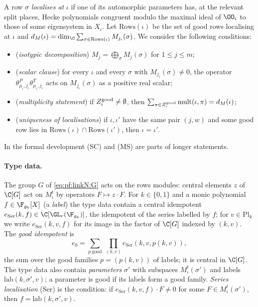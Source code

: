A row $\sigma$ \emph{localises at} $\iota$ if one of its automorphic parameters has, at the relevant split places, Hecke
polynomials congruent modulo the maximal ideal of $\OO_\iota$ to those of some eigensystem in $X_\iota$. Let $\mathrm{Rows}(\iota)$ be
the set of good rows localising at $\iota$ and $d_M(\iota)=\dim_\C\sum_{\sigma\in\mathrm{Rows}(\iota)}M_{j_\iota}(\sigma)$. We consider
the following conditions:
\begin{itemize}[leftmargin=3.2em]
\item[(ID)] (\emph{isotypic decomposition}) $M_j=\bigoplus_\sigma M_j(\sigma)$ for $1\le j\le m$;
\item[(SC)] (\emph{scalar clause}) for every $\iota$ and every $\sigma$ with $M_{j_\iota}(\sigma)\ne0$, the operator
$\theta^P_{\mu_\iota,j_\iota}\theta^T_{\mu_\iota,j_\iota}$ acts on $M_{j_\iota}(\sigma)$ as a positive real scalar;
\item[(MS)] (\emph{multiplicity statement}) if $Z^{\mathrm{good}}_\iota\ne\emptyset$, then
$\sum_{\pi\in Z^{\mathrm{good}}_\iota}\mathrm{mult}(\iota,\pi)=d_M(\iota)$;
\item[(LU)] (\emph{uniqueness of localisations}) if $\iota,\iota'$ have the same pair $(j,w)$ and some good row lies in
$\mathrm{Rows}(\iota)\cap\mathrm{Rows}(\iota')$, then $\iota=\iota'$.
\end{itemize}
In the formal development (SC) and (MS) are parts of longer statements.

\paragraph{Type data.}
The group $G$ of \eqref{eq:pf:linkN:G} acts on the rows modules: central elements $z$ of $\C[G]$ act on $M^t_\iota$ by operators
$F\mapsto z\cdot F$. For $k\in\{0,1\}$ and a monic polynomial $f\in\F_{g_k}[X]$ (a \emph{label}) the type data contain a central
idempotent $e_{\mathrm{Ser}}(k,f)\in\C[\GL_r(\F_{g_k})]$, the idempotent of the series labelled by $f$; for $v\in\mathrm{Pl}_k$ we
write $e_{\mathrm{Ser}}(k,v,f)$ for its image in the factor of $\C[G]$ indexed by $(k,v)$. The \emph{good idempotent} is
\[
e_0=\sum_{p\ \mathrm{good}}\ \prod_{(k,v)}e_{\mathrm{Ser}}(k,v,p(k,v)),
\]
the sum over the good families $p=(p(k,v))$ of labels; it is central in $\C[G]$. The type data also contain \emph{parameters}
$\sigma'$ with subspaces $M^t_\iota(\sigma')$ and labels $\mathrm{lab}(k,\sigma',v)$; a parameter is good if its labels form a good
family. \emph{Series localisation} (Ser) is the condition: if $e_{\mathrm{Ser}}(k,v,f)\cdot F\ne0$ for some
$F\in M^t_\iota(\sigma')$, then $f=\mathrm{lab}(k,\sigma',v)$.

